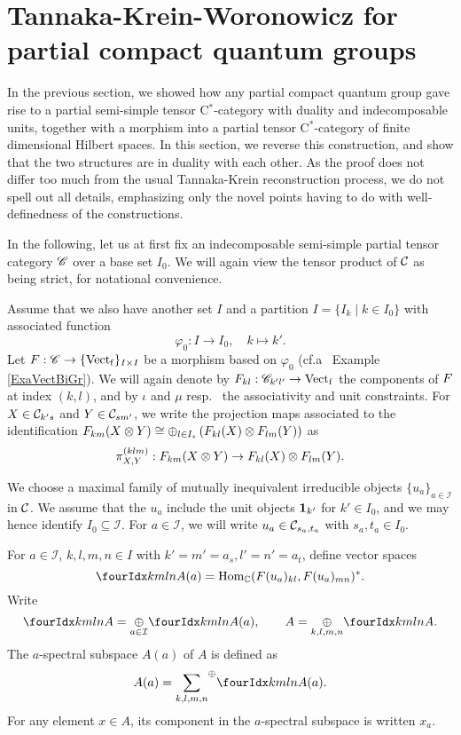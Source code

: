 \section{Tannaka-Krein-Woronowicz for partial compact quantum groups}


In the previous section, we showed how any partial compact quantum group gave rise to a partial semi-simple tensor C$^*$-category with duality and indecomposable units, together with a morphism into a partial tensor C$^*$-category of finite dimensional Hilbert spaces. In this section, we reverse this construction, and show that the two structures are in duality with each other. As the proof does not differ too much from the usual Tannaka-Krein reconstruction process, we do not spell out all details, emphasizing only the novel points having to do with well-definedness of the constructions. 

In the following, let us at first fix an indecomposable semi-simple partial tensor category $\mathscr{C}$ over a base set $I_0$. We will again view the tensor product of $\mathcal{C}$ as being strict, for notational convenience. 

Assume that we also have another set $I$ and a partition $I = \{I_k\mid k\in I_0\}$ with associated function \[\varphi_0:I\rightarrow I_0, \quad k\mapsto k'.\] Let $F: \mathscr{C}\rightarrow \{\mathrm{Vect}_{\operatorname{\mathrm{f}}}\}_{I\times I}$ be a morphism based on $\varphi_0$ (cf.a~ Example \ref{ExaVectBiGr}).  We will again denote by $F_{kl}:\mathscr{C}_{k'l'}\rightarrow \mathrm{Vect}_{\operatorname{\mathrm{f}}}$ the components of $F$ at index $(k,l)$, and by $\iota$ and $\mu$ resp.~ the associativity and unit constraints.  For $X\in \mathcal{C}_{k's}$ and $Y\in \mathcal{C}_{sm'}$, we write the projection maps associated to the identification $F_{km}(X\otimes Y)\cong \oplus_{l\in I_s} \left(F_{kl}(X)\otimes F_{lm}(Y)\right)$ as \[\pi^{(klm)}_{X,Y}:F_{km}(X\otimes Y) \rightarrow F_{kl}(X)\otimes F_{lm}(Y).\]

We choose a maximal family of mutually inequivalent irreducible objects $\{u_a\}_{a\in \mathcal{I}}$ in $\mathcal{C}$. We assume that the $u_a$ include the unit objects $\mathbf{1}_{k'}$ for $k'\in I_0$, and we may hence identify $I_0\subseteq \mathcal{I}$. For $a\in \mathcal{I}$, we will write $u_a \in \mathcal{C}_{s_a,t_a}$ with $s_a,t_a\in I_0$.

\begin{Def} For $a\in \mathcal{I}$, $k,l,m,n\in I$ with $k'=m'=a_s,l'=n'=a_t$, define vector spaces \[\Gr{A}{k}{l}{m}{n}(a) = \Hom_{\C}(\Forget(u_a)_{kl},\Forget(u_a)_{mn})^*.\] Write \[\Gr{A}{k}{l}{m}{n} = \underset{a\in \mathcal{I}}{\oplus} \Gr{A}{k}{l}{m}{n}(a),\qquad A = \underset{k,l,m,n}{\oplus} \Gr{A}{k}{l}{m}{n}.\] The $a$-spectral subspace $A(a)$ of $A$ is defined as \[A(a) = \osum{k,l,m,n} \Gr{A}{k}{l}{m}{n}(a).\] For any element $x\in A$, its component in the $a$-spectral subspace is written $x_a$.
\end{Def} 

